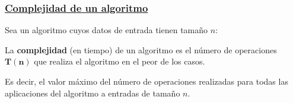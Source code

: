 \documentclass[twoside]{report}
\newcommand{\bs}[1]{\boldsymbol{#1}}
\begin{document}
%
%
%
%
%



\subsubsection{\underline{Complejidad de un algoritmo}}

Sea un algoritmo cuyos datos de entrada tienen tamaño $n$:
\vspace{0.4cm}

\begin{defi}
La \textbf{complejidad} (en tiempo) de un algoritmo es el nú\-me\-ro de operaciones $\bs{T(n)}$ que realiza el algoritmo en el peor de los casos.


\vspace{0.2cm}

Es decir, el valor máximo del número de operaciones realizadas para todas las aplicaciones del algoritmo a entradas de tamaño $n.$
\end{defi}
\end{document}
